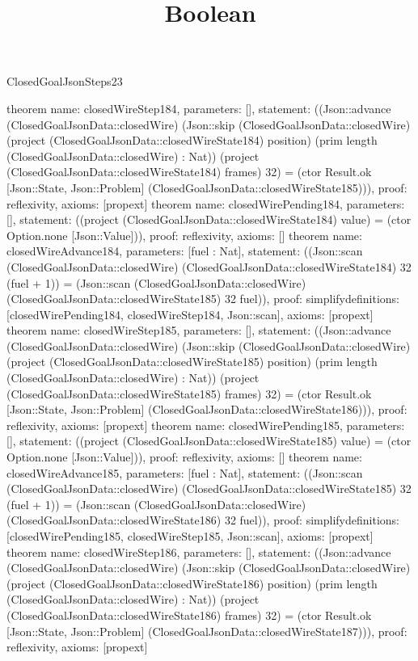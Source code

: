 \begin{lexlean}{ClosedGoalJsonSteps23}
\title{Boolean}
\begin{semanticmodule}
theorem{
 name: closedWireStep184, parameters: [],
 statement: ((Json::advance (ClosedGoalJsonData::closedWire) (Json::skip (ClosedGoalJsonData::closedWire) (project (ClosedGoalJsonData::closedWireState184) position) (prim length (ClosedGoalJsonData::closedWire) : Nat)) (project (ClosedGoalJsonData::closedWireState184) frames) 32) = (ctor Result.ok [Json::State, Json::Problem] (ClosedGoalJsonData::closedWireState185))), proof: reflexivity{}, axioms: [propext]
}
theorem{
 name: closedWirePending184, parameters: [],
 statement: ((project (ClosedGoalJsonData::closedWireState184) value) = (ctor Option.none [Json::Value])), proof: reflexivity{}, axioms: []
}
theorem{
 name: closedWireAdvance184, parameters: [fuel : Nat],
 statement: ((Json::scan (ClosedGoalJsonData::closedWire) (ClosedGoalJsonData::closedWireState184) 32 (fuel + 1)) = (Json::scan (ClosedGoalJsonData::closedWire) (ClosedGoalJsonData::closedWireState185) 32 fuel)), proof: simplify{definitions: [closedWirePending184, closedWireStep184, Json::scan]}, axioms: [propext]
}
theorem{
 name: closedWireStep185, parameters: [],
 statement: ((Json::advance (ClosedGoalJsonData::closedWire) (Json::skip (ClosedGoalJsonData::closedWire) (project (ClosedGoalJsonData::closedWireState185) position) (prim length (ClosedGoalJsonData::closedWire) : Nat)) (project (ClosedGoalJsonData::closedWireState185) frames) 32) = (ctor Result.ok [Json::State, Json::Problem] (ClosedGoalJsonData::closedWireState186))), proof: reflexivity{}, axioms: [propext]
}
theorem{
 name: closedWirePending185, parameters: [],
 statement: ((project (ClosedGoalJsonData::closedWireState185) value) = (ctor Option.none [Json::Value])), proof: reflexivity{}, axioms: []
}
theorem{
 name: closedWireAdvance185, parameters: [fuel : Nat],
 statement: ((Json::scan (ClosedGoalJsonData::closedWire) (ClosedGoalJsonData::closedWireState185) 32 (fuel + 1)) = (Json::scan (ClosedGoalJsonData::closedWire) (ClosedGoalJsonData::closedWireState186) 32 fuel)), proof: simplify{definitions: [closedWirePending185, closedWireStep185, Json::scan]}, axioms: [propext]
}
theorem{
 name: closedWireStep186, parameters: [],
 statement: ((Json::advance (ClosedGoalJsonData::closedWire) (Json::skip (ClosedGoalJsonData::closedWire) (project (ClosedGoalJsonData::closedWireState186) position) (prim length (ClosedGoalJsonData::closedWire) : Nat)) (project (ClosedGoalJsonData::closedWireState186) frames) 32) = (ctor Result.ok [Json::State, Json::Problem] (ClosedGoalJsonData::closedWireState187))), proof: reflexivity{}, axioms: [propext]
}
\end{semanticmodule}
\end{lexlean}
